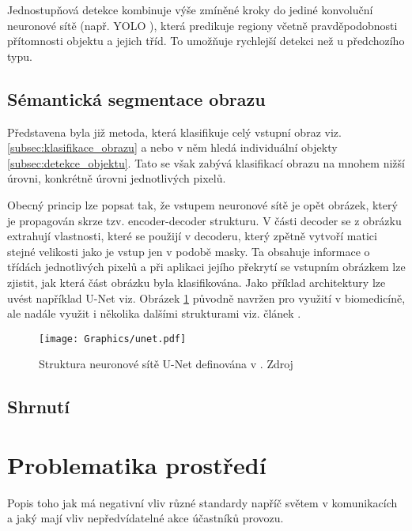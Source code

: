 \documentclass[czech, bc, kky, he, iso690numb]{fasthesis}
\begin{document}
           		Jednostupňová detekce kombinuje výše zmíněné kroky do jediné konvoluční neuronové sítě (např. YOLO \cite{YOLO}), která predikuje regiony včetně pravděpodobnosti přítomnosti objektu a jejich tříd. To umožňuje rychlejší detekci než u předchozího typu.
           	
           	\subsection{Sémantická segmentace obrazu}
            	Představena byla již metoda, která klasifikuje celý vstupní obraz viz. \ref{subsec:klasifikace_obrazu} a nebo v něm hledá individuální objekty \ref{subsec:detekce_objektu}. Tato se však zabývá klasifikací obrazu na mnohem nižší úrovni, konkrétně úrovni jednotlivých pixelů.
            	
            	Obecný princip lze popsat tak, že vstupem neuronové sítě je opět obrázek, který je propagován skrze tzv. encoder-decoder strukturu. V části decoder se z obrázku extrahují vlastnosti, které se použijí v decoderu, který zpětně vytvoří matici stejné velikosti jako je vstup jen v podobě masky. Ta obsahuje informace o třídách jednotlivých pixelů a při aplikaci jejího překrytí se vstupním obrázkem lze zjistit, jak která část obrázku byla klasifikována. Jako příklad architektury lze uvést například U-Net \cite{U-Net} viz. Obrázek \ref{pic:unet} původně navržen pro využití v biomedicíně, ale nadále využit i několika dalšími strukturami viz. článek \cite{semantic_segmentation_survey}.
            	
	            	\begin{figure}[h]
	            		\centering
	            		\texttt{[image: Graphics/unet.pdf]}
	            		\caption{Struktura neuronové sítě U-Net definována v \cite{U-Net}. Zdroj \cite{U-Net}}
	            		\label{pic:unet}
	            	\end{figure}
            	
            \subsection{Shrnutí}
            	
            
    	\section{Problematika prostředí}
    		Popis toho jak má negativní vliv různé standardy napříč světem v komunikacích a jaký mají vliv nepředvídatelné akce účastníků provozu.
\end{document}

